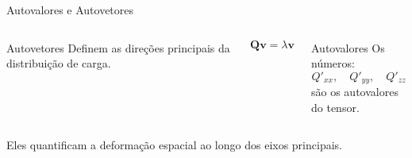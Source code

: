\documentclass[aspectratio=169]{beamer}
\begin{document}
\begin{frame}{Autovalores e Autovetores}

\begin{columns}


\begin{mybox}{Autovetores}
Definem as direções principais da distribuição de carga.
\end{mybox}

\vspace{0.3cm}

\begin{eqbox}
\[
\mathbf Q\mathbf v
=
\lambda \mathbf v
\]
\end{eqbox}


\begin{alertblock}{Autovalores}
Os números:
\[
Q'_{xx},
\quad
Q'_{yy},
\quad
Q'_{zz}
\]
são os autovalores do tensor.
\end{alertblock}

\end{columns}

\vspace{0.5cm}

\begin{center}

\Large
Eles quantificam a deformação espacial ao longo dos eixos principais.

\end{center}

\end{frame}
\end{document}
